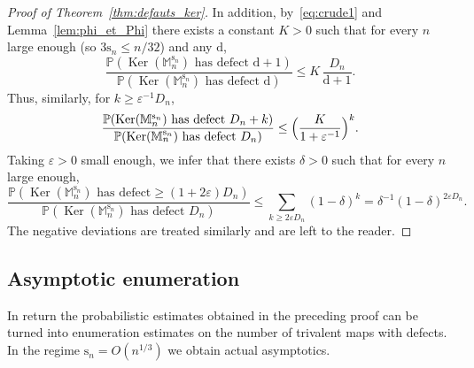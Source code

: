 \documentclass[10pt]{amsart}
\theoremstyle{plain}
\theoremstyle{definition}
\theoremstyle{remark}
\renewcommand{\P}{\mathbb{P}}
\newcommand{\Mapb}{\mathbb{M}}
\newcommand{\defect}{\mathrm{d}}
\newcommand{\spar}{\mathrm{s}}
\DeclareMathOperator{\Ker}{Ker}
\begin{document}
\begin{proof}[Proof of Theorem~\ref{thm:defauts_ker}]
In addition, by~\eqref{eq:crude1} and Lemma~\ref{lem:phi_et_Phi} there exists a constant $K>0$ such that for every $n$ large enough (so \eg $3\spar_n \le n/32$) and any $\defect$,
\[
\frac{\P(\Ker(\Mapb_n^{\spar_n}) \textrm{ has defect } \defect+1)}{\P(\Ker(\Mapb_n^{\spar_n}) \textrm{ has defect } \defect)}
\le K\, \frac{D_n}{\defect+1}.
\]
Thus, similarly, for $k \ge \varepsilon^{-1} D_n$,
\[
\frac{\P(\Ker(\Mapb_n^{\spar_n}) \textrm{ has defect } D_n+k)}{\P(\Ker(\Mapb_n^{\spar_n}) \textrm{ has defect } D_n)}
\le \Bigl(\frac{K}{1+\varepsilon^{-1}}\Bigr)^k.
\]
Taking $\varepsilon>0$ small enough, we infer that there exists $\delta > 0$ such that for every $n$ large enough,
\[
\frac{\P(\Ker(\Mapb_n^{\spar_n}) \textrm{ has defect} \ge (1+2\varepsilon) D_n)}{\P(\Ker(\Mapb_n^{\spar_n}) \textrm{ has defect } D_n)}
\le \sum_{k \ge 2\varepsilon D_n} (1-\delta)^k = \delta^{-1} (1-\delta)^{2\varepsilon D_n}.
\]
The negative deviations are treated similarly and are left to the reader.
\end{proof}

\subsection{Asymptotic enumeration}
\label{ssec:asymp_enum}
In return the probabilistic estimates obtained in the preceding proof can be turned into enumeration estimates on the number of trivalent maps with defects. In the regime $\spar_{n} = O(n^{1/3})$ we obtain actual asymptotics.
\end{document}
